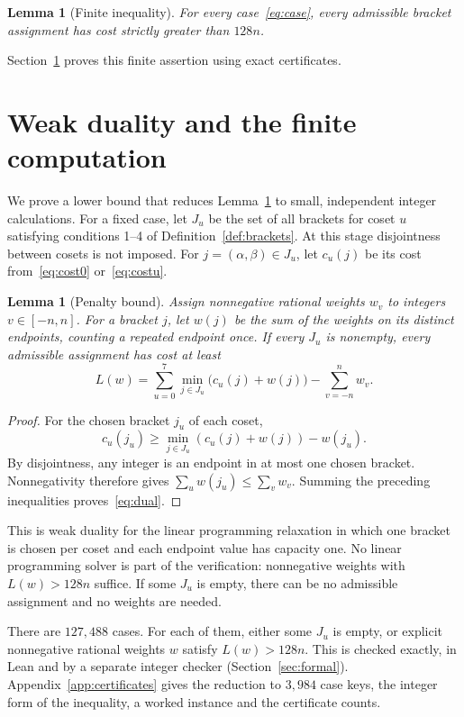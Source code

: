 \documentclass[11pt]{article}
\newtheorem{lemma}[theorem]{Lemma}
\theoremstyle{definition}
\begin{document}
\begin{lemma}[Finite inequality]\label{lem:finite}
For every case~\eqref{eq:case}, every admissible bracket assignment
has cost strictly greater than $128n$.
\end{lemma}

Section~\ref{sec:certificates} proves this finite assertion using exact
certificates.

\section{Weak duality and the finite computation}\label{sec:certificates}
We prove a lower bound that reduces Lemma~\ref{lem:finite} to small,
independent integer calculations. For a fixed case, let $J_u$ be the
set of all brackets for coset $u$ satisfying conditions 1--4 of
Definition~\ref{def:brackets}. At this stage disjointness between cosets
is not imposed. For $j=(\alpha,\beta)\in J_u$, let $c_u(j)$ be its
cost from~\eqref{eq:cost0} or~\eqref{eq:costu}.

\begin{lemma}[Penalty bound]\label{lem:dual}
Assign nonnegative rational weights $w_v$ to integers $v\in[-n,n]$.
For a bracket $j$, let $w(j)$ be the sum of the weights on its distinct
endpoints, counting a repeated endpoint once. If every $J_u$ is
nonempty, every admissible assignment has cost at least
\begin{equation}\label{eq:dual}
 L(w)=\sum_{u=0}^7\min_{j\in J_u}\bigl(c_u(j)+w(j)\bigr)
                                      -\sum_{v=-n}^n w_v.
\end{equation}
\end{lemma}
\begin{proof}
For the chosen bracket $j_u$ of each coset,
\[
 c_u(j_u)\geq\min_{j\in J_u}(c_u(j)+w(j))-w(j_u).
\]
By disjointness, any integer is an endpoint in at most one chosen
bracket. Nonnegativity therefore gives
$\sum_u w(j_u)\leq\sum_v w_v$.
Summing the preceding inequalities proves~\eqref{eq:dual}.
\end{proof}

This is weak duality for the linear programming relaxation in which
one bracket is chosen per coset and each endpoint value has capacity
one. No linear programming solver is part of the verification:
nonnegative weights with $L(w)>128n$ suffice. If some $J_u$ is empty,
there can be no admissible assignment and no weights are needed.

There are $127{,}488$ cases. For each of them, either some $J_u$ is
empty, or explicit nonnegative rational weights $w$ satisfy
$L(w)>128n$. This is checked exactly, in Lean and by a separate integer
checker (Section~\ref{sec:formal}). Appendix~\ref{app:certificates}
gives the reduction to $3{,}984$ case keys, the integer form of the
inequality, a worked instance and the certificate counts.
\end{document}

